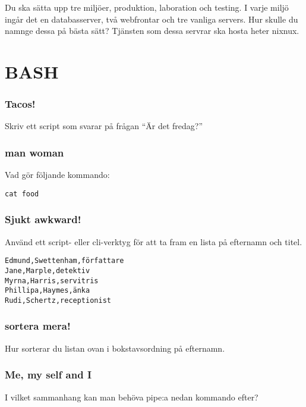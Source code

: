 Du ska sätta upp tre miljöer, produktion, laboration och testing. I
varje miljö ingår det en databasserver, två webfrontar och tre vanliga
servers. Hur skulle du namnge dessa på bästa sätt? Tjänsten som dessa
servrar ska hosta heter nixnux.

\section{BASH}\label{bash}

\subsubsection{Tacos!}\label{tacos}

Skriv ett script som svarar på frågan ``Är det fredag?''

\subsubsection{man woman}\label{man-woman}

Vad gör följande kommando:

\begin{verbatim}
cat food
\end{verbatim}

\subsubsection{Sjukt awkward!}\label{sjukt-awkward}

Använd ett script- eller cli-verktyg för att ta fram en lista på
efternamn och titel.

\begin{verbatim}
Edmund,Swettenham,författare
Jane,Marple,detektiv
Myrna,Harris,servitris
Phillipa,Haymes,änka
Rudi,Schertz,receptionist
\end{verbatim}

\subsubsection{sortera mera!}\label{sortera-mera}

Hur sorterar du listan ovan i bokstavsordning på efternamn.

\subsubsection{Me, my self and I}\label{me-my-self-and-i}

I vilket sammanhang kan man behöva pipe:a nedan kommando efter?

